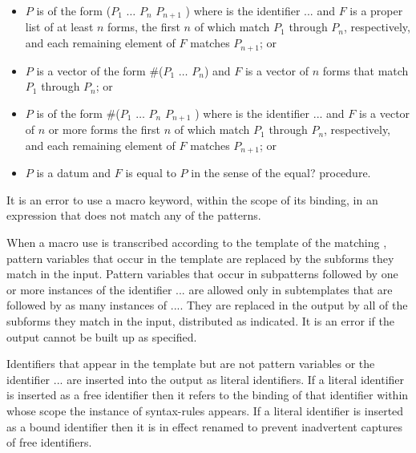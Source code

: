 \begin{entry}{%
}
\begin{itemize}
\item $P$ is of the form
      {\cf ($P_1$ $\dots$ $P_n$ $P_{n+1}$ )}
      where  is the identifier {\cf ...}
      and $F$ is
      a proper list of at least $n$ forms, the first $n$ of which match
      $P_1$ through $P_n$, respectively, and each remaining element of $F$
      matches $P_{n+1}$; or

\item $P$ is a vector of the form {\cf \#($P_1$ $\dots$ $P_n$)}
      and $F$ is a vector
      of $n$ forms that match $P_1$ through $P_n$; or

\item $P$ is of the form
      {\cf \#($P_1$ $\dots$ $P_n$ $P_{n+1}$ )}
      where  is the identifier {\cf ...}
      and $F$ is a vector of $n$
      or more forms the first $n$ of which match
      $P_1$ through $P_n$, respectively, and each remaining element of $F$
      matches $P_{n+1}$; or

\item $P$ is a datum and $F$ is equal to $P$ in the sense of
      the {\cf equal?} procedure.
\end{itemize}

It is an error to use a macro keyword, within the scope of its
binding, in an expression that does not match any of the patterns.

When a macro use is transcribed according to the template of the
matching , pattern variables that occur in the
template are replaced by the subforms they match in the input.
Pattern variables that occur in subpatterns followed by one or more
instances of the identifier
{\cf ...} are allowed only in subtemplates that are
followed by as many instances of {\cf ...}.
They are replaced in the
output by all of the subforms they match in the input, distributed as
indicated.  It is an error if the output cannot be built up as
specified.


Identifiers that appear in the template but are not pattern variables
or the identifier
{\cf ...} are inserted into the output as literal identifiers.  If a
literal identifier is inserted as a free identifier then it refers to the
binding of that identifier within whose scope the instance of
{\cf syntax-rules} appears.
If a literal identifier is inserted as a bound identifier then it is
in effect renamed to prevent inadvertent captures of free identifiers.


\end{entry}
